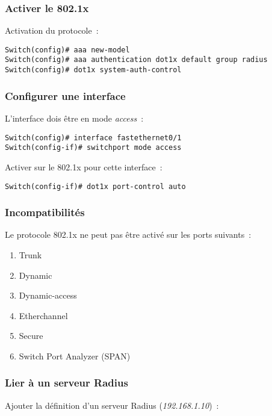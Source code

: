 \subsubsection{Activer le 802.1x}

Activation du protocole~:

\begin{lstlisting}
Switch(config)# aaa new-model
Switch(config)# aaa authentication dot1x default group radius
Switch(config)# dot1x system-auth-control
\end{lstlisting}

\subsubsection{Configurer une interface}

L'interface dois être en mode \emph{access}~:

\begin{lstlisting}
Switch(config)# interface fastethernet0/1
Switch(config-if)# switchport mode access
\end{lstlisting}

Activer sur le 802.1x pour cette interface~:

\begin{lstlisting}
Switch(config-if)# dot1x port-control auto
\end{lstlisting}

\subsubsection{Incompatibilités}

Le protocole 802.1x ne peut pas être activé sur les ports suivants~:

\begin{enumerate}
\item Trunk
\item Dynamic
\item Dynamic-access
\item Etherchannel
\item Secure
\item Switch Port Analyzer (SPAN)
\end{enumerate}

\subsubsection{Lier à un serveur Radius}

Ajouter la définition d'un serveur Radius (\emph{192.168.1.10})~:

